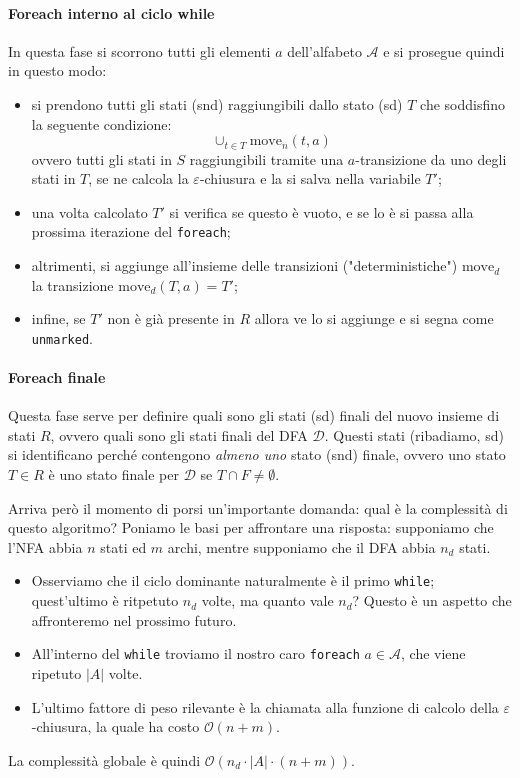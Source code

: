 \documentclass[class=book, crop=false, oneside, 12pt]{standalone}
\begin{document}
\paragraph*{Foreach interno al ciclo while}
In questa fase si scorrono tutti gli elementi \(a\) dell'alfabeto \(\mathcal{A}\) e si prosegue quindi in questo modo:
\begin{itemize}
    \item si prendono tutti gli stati (snd) raggiungibili dallo stato (sd) \(T\) che soddisfino la seguente condizione:
    \begin{equation*}
        \cup_{t \in T} \textrm{move}_n(t,a)
    \end{equation*}
    ovvero tutti gli stati in \(S\) raggiungibili tramite una \(a\)-transizione da uno degli stati in \(T\), se ne calcola la \(\varepsilon\)-chiusura e la si salva nella variabile \(T'\);
    \item una volta calcolato \(T'\) si verifica se questo è vuoto, e se lo è si passa alla prossima iterazione del \texttt{foreach};
    \item altrimenti, si aggiunge all'insieme delle transizioni ("deterministiche") \(\textrm{move}_d\) la transizione \(\textrm{move}_d(T, a) = T'\);
    \item infine, se \(T'\) non è già presente in \(R\) allora ve lo si aggiunge e si segna come \texttt{unmarked}.
\end{itemize}

\paragraph*{Foreach finale}
Questa fase serve per definire quali sono gli stati (sd) finali del nuovo insieme di stati \(R\), ovvero quali sono gli stati finali del DFA \(\mathcal{D}\). Questi stati (ribadiamo, sd) si identificano perché contengono \emph{almeno uno} stato (snd) finale, ovvero uno stato \(T \in R\) è uno stato finale per \(\mathcal{D}\) se \(T \cap F \neq \emptyset\).

Arriva però il momento di porsi un'importante domanda: qual è la complessità di questo algoritmo?
Poniamo le basi per affrontare una risposta: supponiamo che l’NFA abbia \(n\) stati ed \(m\) archi, mentre supponiamo che il DFA abbia \(n_d\) stati.
\begin{itemize}
    \item Osserviamo che il ciclo dominante naturalmente è il primo \texttt{while}; quest'ultimo  è ritpetuto \(n_d\) volte, ma quanto vale \(n_d\)? Questo è un aspetto che affronteremo nel prossimo futuro.
    \item All'interno del \texttt{while} troviamo il nostro caro \texttt{foreach} \(a \in \mathcal{A}\), che viene ripetuto \(|A|\) volte.
    \item L'ultimo fattore di peso rilevante è la chiamata alla funzione di calcolo della \(\varepsilon\)-chiusura, la quale ha costo \(\mathcal{O}(n+m)\).
\end{itemize}
La complessità globale è quindi \( \mathcal{O}(n_d \cdot |A| \cdot (n+m))\).
\end{document}
